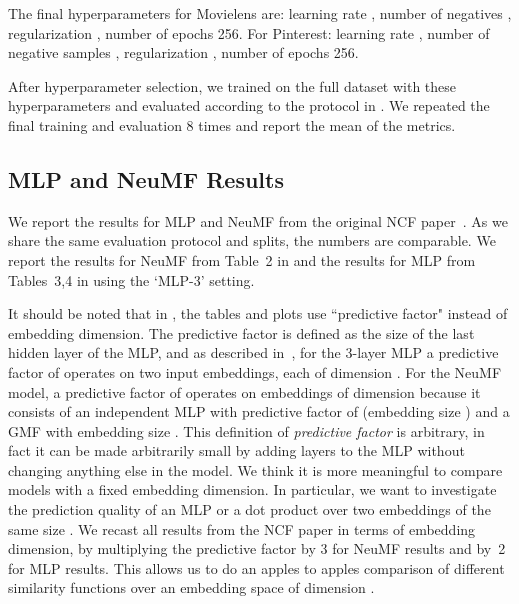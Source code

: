 \documentclass{article}
\begin{document}
The final hyperparameters for Movielens are: learning rate , number of negatives , regularization , number of epochs 256.
For Pinterest: learning rate , number of negative samples , regularization , number of epochs 256.

After hyperparameter selection, we trained on the full dataset with these hyperparameters and evaluated according to the protocol in \cite{he:www17}.
We repeated the final training and evaluation 8 times and report the mean of the metrics.

\subsection{MLP and NeuMF Results}

We report the results for MLP and NeuMF from the original NCF paper~\cite{he:www17}.
As we share the same evaluation protocol and splits, the numbers are comparable.
We report the results for NeuMF from Table~2 in \cite{he:www17} and the results for MLP from Tables~3,4 in \cite{he:www17} using the `MLP-3' setting.

\label{sec:predictive_factor}
It should be noted that in \cite{he:www17}, the tables and plots use ``predictive factor" instead of embedding dimension. The predictive factor is defined as the size of the last hidden layer of the MLP, and as described in~\cite{he:www17}, for the 3-layer MLP a predictive factor of  operates on two input embeddings, each of dimension .
For the NeuMF model, a predictive factor of  operates on embeddings of dimension  because it consists of an independent MLP with predictive factor of  (embedding size ) and a GMF with embedding size .
This definition of \emph{predictive factor} is arbitrary, in fact it can be made arbitrarily small by adding layers to the MLP without changing anything else in the model.
We think it is more meaningful to compare models with a fixed embedding dimension.
In particular, we want to investigate the prediction quality of an MLP or a dot product over two embeddings of the same size .
We recast all results from the NCF paper in terms of embedding dimension, by multiplying the predictive factor by 3 for NeuMF results and by~2 for MLP results.
This allows us to do an apples to apples comparison of different similarity functions over an embedding space of dimension .
\end{document}
